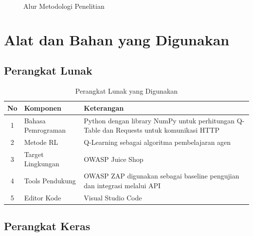 \begin{figure}[H]
{
}
\caption{Alur Metodologi Penelitian}
\label{fig:alur_metodologi_penelitian}
\end{figure}

\section{Alat dan Bahan yang Digunakan}

\subsection{Perangkat Lunak}

\begin{table}[H]
\centering
\begin{tabular}{|c|l|p{8cm}|}
\hline
\textbf{No} & \textbf{Komponen} & \textbf{Keterangan} \\ \hline

1 & Bahasa Pemrograman & Python dengan library NumPy untuk perhitungan Q-Table dan Requests untuk komunikasi HTTP \\ \hline

2 & Metode RL & Q-Learning sebagai algoritma pembelajaran agen \\ \hline

3 & Target Lingkungan & OWASP Juice Shop \\ \hline

4 & Tools Pendukung & OWASP ZAP digunakan sebagai baseline pengujian dan integrasi melalui API \\ \hline

5 & Editor Kode & Visual Studio Code \\ \hline

\end{tabular}
\caption{Perangkat Lunak yang Digunakan}
\end{table}

\subsection{Perangkat Keras}


